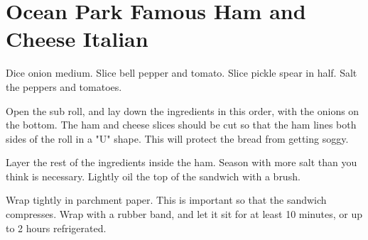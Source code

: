 \section{Ocean Park Famous Ham and Cheese Italian}
\begin{recipe}



Dice onion medium. Slice bell pepper and tomato. 
Slice pickle spear in half. Salt the peppers and tomatoes. 


Open the sub roll, and lay down the ingredients in this order, with the onions on the bottom.
The ham and cheese slices should be cut so that the ham lines both sides of the roll in a "U" shape.
This will protect the bread from getting soggy.

Layer the rest of the ingredients inside the ham. Season with more salt than you think is necessary. 
Lightly oil the top of the sandwich with a brush. 

Wrap tightly in parchment paper. This is important so that the sandwich compresses. Wrap with a rubber
band, and let it sit for at least 10 minutes, or up to 2 hours refrigerated. 

\end{recipe}
